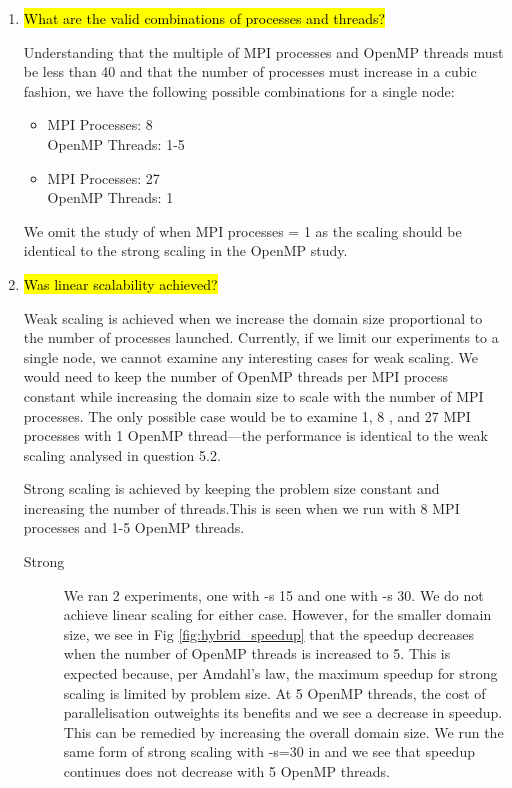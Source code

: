 \documentclass{article}
\begin{document}
\begin{enumerate}
	\item \hl{What are the valid combinations of processes and threads?}

	Understanding that the multiple of MPI processes and OpenMP threads must be less than 40 and that the number of processes must increase in a cubic fashion, we have the following possible combinations for a single node:
	\begin{itemize}
		\item   MPI Processes: 8\\
				OpenMP Threads: 1-5
		\item	MPI Processes: 27\\
				OpenMP Threads: 1
	\end{itemize}
	
	We omit the study of when MPI processes = 1 as the scaling should be identical to the strong scaling in the OpenMP study.
	
	\item \hl{Was linear scalability achieved?}
	
	Weak scaling is achieved when we increase the domain size proportional to the number of processes launched. Currently, if we limit our experiments to a single node, we cannot examine any interesting cases for weak scaling. We would need to keep the number of OpenMP threads per MPI process constant while increasing the domain size to scale with the number of MPI processes. The only possible case would be to examine 1, 8 , and 27 MPI processes with 1 OpenMP thread---the performance is identical to the weak scaling analysed in question 5.2.
	
	Strong scaling is achieved by keeping the problem size constant and increasing the number of threads.This is seen when we run with 8 MPI processes and 1-5 OpenMP threads. 
	
	\begin{description}
		\item[Strong] We ran 2 experiments, one with -s 15 and one with -s 30. We do not achieve linear scaling for either case. However, for the smaller domain size, we see in Fig \ref{fig:hybrid_speedup} that the speedup decreases when the number of OpenMP threads is increased to 5. This is expected because, per Amdahl's law, the maximum speedup for strong scaling is limited by problem size. At 5 OpenMP threads, the cost of parallelisation outweights its benefits and we see a decrease in speedup. This can be remedied by increasing the overall domain size. We run the same form of strong scaling with -s=30 in and we see that speedup continues does not decrease with 5 OpenMP threads.


\end{description}
\end{enumerate}
\end{document}
